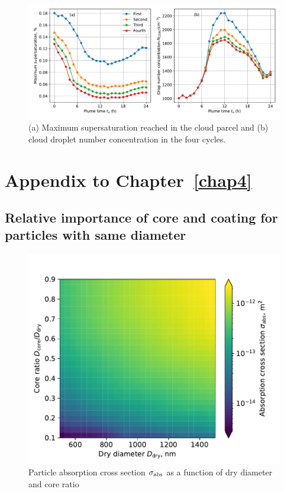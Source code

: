 \documentclass[edeposit,fullpage]{uiucthesis2009}
\begin{document}
\begin{figure}
    \centering
    \includegraphics[scale=0.5]{chap3_figs/fig_sup8.pdf}
    \caption{(a) Maximum supersaturation reached in the cloud parcel
      and (b) cloud droplet number concentration in the four cycles.}
    \label{fig:max_ss-cycle}
\end{figure}

\chapter{Appendix to Chapter~\ref{chap4}}
\label{tab:AppC}
\section{Relative importance of core and coating for particles with same diameter }

\begin{figure}[H]
	\centering
	\includegraphics[scale=0.6]{chap4_figs/fig_sup1.pdf}
	\caption{Particle absorption cross section $\sigma_{\rm abs}$ as a function of dry diameter and core ratio}
	\label{fig_sup1}
\end{figure}
\end{document}
